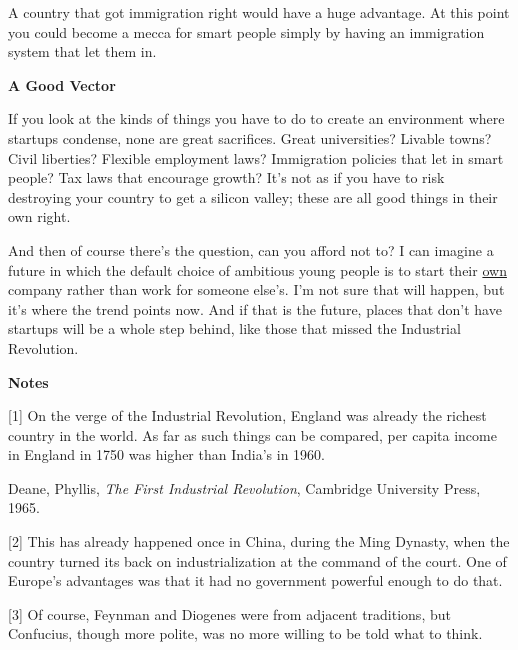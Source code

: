 A country that got immigration right
                  would have a huge advantage. At this point you could become a
                  mecca for smart people simply by having an immigration system
                  that let them in.

\textbf{A Good Vector}

If you look at the kinds of things you have to do
                  to create an environment where startups condense, none are
                  great sacrifices. Great universities? Livable towns? Civil
                  liberties? Flexible employment laws? Immigration policies that
                  let in smart people? Tax laws that encourage growth? It's not
                  as if you have to risk destroying your country to get a
                  silicon valley; these are all good things in their own
                  right.

And then of course there's the question, can
                  you afford not to? I can imagine a future in which the default
                  choice of ambitious young people is to start their
                  \href{http://www.paulgraham.com/hiring.html}{own} company rather than work for
                  someone else's. I'm not sure that will happen, but it's where
                  the trend points now. And if that is the future, places that
                  don't have startups will be a whole step behind, like those
                  that missed the Industrial Revolution.





\textbf{Notes}

[1] On the verge of the Industrial Revolution, England was
                  already the richest country in the world. As far as such
                  things can be compared, per capita income in England in 1750
                  was higher than India's in 1960.

Deane, Phyllis,
                  \emph{The First Industrial Revolution}, Cambridge University
                  Press, 1965.

[2] This has already happened once in China, during the Ming
                  Dynasty, when the country turned its back on industrialization
                  at the command of the court. One of Europe's advantages was
                  that it had no government powerful enough to do that.

[3] Of course, Feynman and Diogenes were from adjacent
                  traditions, but Confucius, though more polite, was no more
                  willing to be told what to think.

